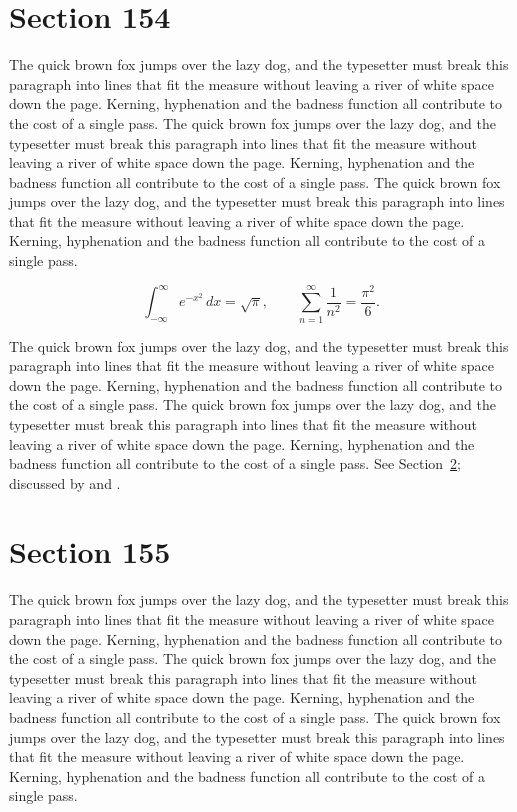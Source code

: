 \documentclass{article}
\begin{document}
\section{Section 154}
\label{sec:154}
The quick brown fox jumps over the lazy dog, and the typesetter must break this paragraph into lines that fit the measure without leaving a river of white space down the page. Kerning, hyphenation and the badness function all contribute to the cost of a single pass. The quick brown fox jumps over the lazy dog, and the typesetter must break this paragraph into lines that fit the measure without leaving a river of white space down the page. Kerning, hyphenation and the badness function all contribute to the cost of a single pass. The quick brown fox jumps over the lazy dog, and the typesetter must break this paragraph into lines that fit the measure without leaving a river of white space down the page. Kerning, hyphenation and the badness function all contribute to the cost of a single pass. 

\begin{equation}\label{eq:154}
\int_{-\infty}^{\infty} e^{-x^{2}}\,dx = \sqrt{\pi}, \qquad
\sum_{n=1}^{\infty} \frac{1}{n^{2}} = \frac{\pi^{2}}{6}.
\end{equation}

The quick brown fox jumps over the lazy dog, and the typesetter must break this paragraph into lines that fit the measure without leaving a river of white space down the page. Kerning, hyphenation and the badness function all contribute to the cost of a single pass. The quick brown fox jumps over the lazy dog, and the typesetter must break this paragraph into lines that fit the measure without leaving a river of white space down the page. Kerning, hyphenation and the badness function all contribute to the cost of a single pass. 
See Section~\ref{sec:155}; discussed by \textcite{k5} and \textcite{l2}.
\section{Section 155}
\label{sec:155}
The quick brown fox jumps over the lazy dog, and the typesetter must break this paragraph into lines that fit the measure without leaving a river of white space down the page. Kerning, hyphenation and the badness function all contribute to the cost of a single pass. The quick brown fox jumps over the lazy dog, and the typesetter must break this paragraph into lines that fit the measure without leaving a river of white space down the page. Kerning, hyphenation and the badness function all contribute to the cost of a single pass. The quick brown fox jumps over the lazy dog, and the typesetter must break this paragraph into lines that fit the measure without leaving a river of white space down the page. Kerning, hyphenation and the badness function all contribute to the cost of a single pass. 
\end{document}
